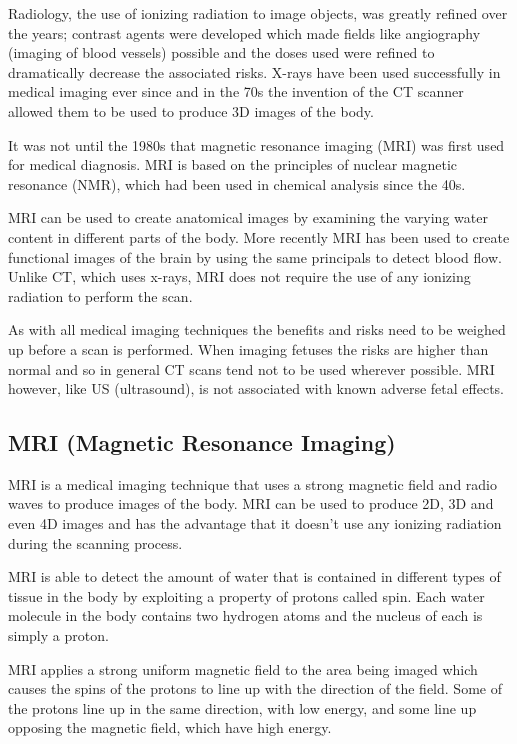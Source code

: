\documentclass[
  oneside,
  11pt, a4paper,
  footinclude=true,
  headinclude=true,
  cleardoublepage=empty
]{scrbook}
\begin{document}
Radiology, the use of ionizing radiation to image objects, was greatly refined over the years; contrast agents were developed which made fields like angiography (imaging of blood vessels) possible\cite{infinityhistory} and the doses used were refined to dramatically decrease the associated risks. X-rays have been used successfully in medical imaging ever since and in the 70s the invention of the CT scanner allowed them to be used to produce 3D images of the body.

It was not until the 1980s that magnetic resonance imaging (MRI) was first used for medical diagnosis. MRI is based on the principles of nuclear magnetic resonance (NMR), which had been used in chemical analysis since the 40s\cite{bshr:mallard}.

MRI can be used to create anatomical images by examining the varying water content in different parts of the body. More recently MRI has been used to create functional images of the brain by using the same principals to detect blood flow\cite{fmri}. Unlike CT, which uses x-rays, MRI does not require the use of any ionizing radiation to perform the scan.

As with all medical imaging techniques the benefits and risks need to be weighed up before a scan is performed. When imaging fetuses the risks are higher than normal and so in general CT scans tend not to be used wherever possible. MRI however, like US (ultrasound), is not associated with known adverse fetal effects.\cite{pregnancyimagingguidelines}

\subsection{MRI (Magnetic Resonance Imaging)\cite{howmriworks}}

MRI is a medical imaging technique that uses a strong magnetic field and radio waves to produce images of the body. MRI can be used to produce 2D, 3D and even 4D images and has the advantage that it doesn’t use any ionizing radiation during the scanning process.

MRI is able to detect the amount of water that is contained in different types of tissue in the body by exploiting a property of protons called spin. Each water molecule in the body contains two hydrogen atoms and the nucleus of each is simply a proton.

MRI applies a strong uniform magnetic field to the area being imaged which causes the spins of the protons to line up with the direction of the field. Some of the protons line up in the same direction, with low energy, and some line up opposing the magnetic field, which have high energy.
\end{document}
